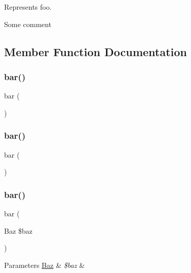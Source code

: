 Represents foo.

Some comment 

\subsection{Member Function Documentation}
\mbox{\label{class_foo_ad2e199af8a32cd5a9a5ba591aac8431c}} 
\subsubsection{\texorpdfstring{bar()}{bar()}\hspace{0.1cm}{\footnotesize\ttfamily [1/5]}}
{\footnotesize\ttfamily bar (\begin{DoxyParamCaption}{ }\end{DoxyParamCaption})}

\mbox{\label{class_foo_ad2e199af8a32cd5a9a5ba591aac8431c}} 
\subsubsection{\texorpdfstring{bar()}{bar()}\hspace{0.1cm}{\footnotesize\ttfamily [2/5]}}
{\footnotesize\ttfamily bar (\begin{DoxyParamCaption}{ }\end{DoxyParamCaption})}

\mbox{\label{class_foo_a3dc02da2254d8b5658d8469b83b40c30}} 
\subsubsection{\texorpdfstring{bar()}{bar()}\hspace{0.1cm}{\footnotesize\ttfamily [3/5]}}
{\footnotesize\ttfamily bar (\begin{DoxyParamCaption}\item[{Baz}]{\$baz }\end{DoxyParamCaption})}


\begin{DoxyParams}[1]{Parameters}
\mbox{\hyperlink{namespace_foo_1_1_baz}{Baz}} & {\em \$baz} & \\
\hline
\end{DoxyParams}
\mbox{\label{class_foo_ad2e199af8a32cd5a9a5ba591aac8431c}} 
